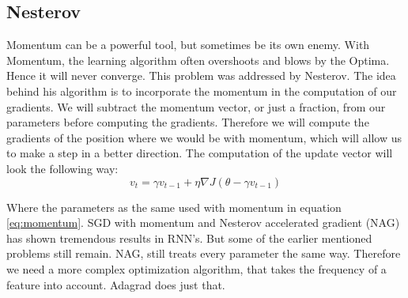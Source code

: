 \subsection{Nesterov}
Momentum can be a powerful tool, but sometimes be its own enemy. With Momentum, the learning algorithm often overshoots and blows by the  Optima. Hence it will never converge. This problem was addressed by Nesterov. The idea behind his algorithm is to incorporate the momentum in the computation of our gradients. We will subtract the momentum vector, or just a fraction,  from our parameters before computing the gradients. Therefore we will compute the gradients of the position where we would be with momentum, which will allow us to make a step in a better direction. The computation of the update vector will look the following way:
\begin{equation}
v_t = \gamma v_{t-1} + \eta \nabla J (\theta -  \gamma v_{t-1})
\end{equation}

Where the parameters as the same used with momentum in equation \ref{eq:momentum}. SGD with momentum and Nesterov accelerated gradient (NAG) has shown tremendous results in RNN's. But some of the earlier mentioned problems still remain.  NAG, still treats every parameter the same way. Therefore we need a more complex optimization algorithm, that takes the frequency of a feature into account. Adagrad does just that. 

